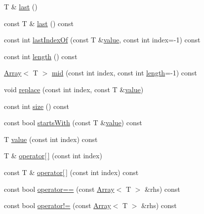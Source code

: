 \begin{DoxyCompactItemize}
\item 
T \& \hyperlink{classprism_1_1containers_1_1_array_a2f4684b738b3964abde9dae379c2ae0c}{last} ()
\item 
const T \& \hyperlink{classprism_1_1containers_1_1_array_a022e0872e94ecedff96f580c51a8b90c}{last} () const 
\item 
const int \hyperlink{classprism_1_1containers_1_1_array_a0c8864fb7d5902f4886d44d8097d6bb9}{last\+Index\+Of} (const T \&\hyperlink{classprism_1_1containers_1_1_array_a6fac700f89e79bd35f5c431dda5ad30f}{value}, const int index=-\/1) const 
\item 
const int \hyperlink{classprism_1_1containers_1_1_array_ac31e19e151e39ffbab34c35e2c1950d5}{length} () const 
\item 
\hyperlink{classprism_1_1containers_1_1_array}{Array}$<$ T $>$ \hyperlink{classprism_1_1containers_1_1_array_adde76ceb2ba2e8b912b237c186193dc8}{mid} (const int index, const int \hyperlink{classprism_1_1containers_1_1_array_ac31e19e151e39ffbab34c35e2c1950d5}{length}=-\/1) const 
\item 
void \hyperlink{classprism_1_1containers_1_1_array_a0b6bafa4ff9a524ed47aa86e76b04482}{replace} (const int index, const T \&\hyperlink{classprism_1_1containers_1_1_array_a6fac700f89e79bd35f5c431dda5ad30f}{value})
\item 
const int \hyperlink{classprism_1_1containers_1_1_array_a9f3a6d530825e137771fef3a317017fb}{size} () const 
\item 
const bool \hyperlink{classprism_1_1containers_1_1_array_a2c00ed6fb1ead0e856056a2a32b3fb8b}{starts\+With} (const T \&\hyperlink{classprism_1_1containers_1_1_array_a6fac700f89e79bd35f5c431dda5ad30f}{value}) const 
\item 
T \hyperlink{classprism_1_1containers_1_1_array_a6fac700f89e79bd35f5c431dda5ad30f}{value} (const int index) const 
\item 
T \& \hyperlink{classprism_1_1containers_1_1_array_ada9e95c663e0665ee0ab0ba9cd129c8b}{operator\mbox{[}$\,$\mbox{]}} (const int index)
\item 
const T \& \hyperlink{classprism_1_1containers_1_1_array_aa5e0a27af6b3b5e201bf99fd15e248a8}{operator\mbox{[}$\,$\mbox{]}} (const int index) const 
\item 
const bool \hyperlink{classprism_1_1containers_1_1_array_a2d6910b75a9dba9bc9f8cc81ddbea0e3}{operator==} (const \hyperlink{classprism_1_1containers_1_1_array}{Array}$<$ T $>$ \&rhs) const 
\item 
const bool \hyperlink{classprism_1_1containers_1_1_array_a84e96ff629ea62cca32f655ad272fc0c}{operator!=} (const \hyperlink{classprism_1_1containers_1_1_array}{Array}$<$ T $>$ \&rhs) const 
\end{DoxyCompactItemize}


